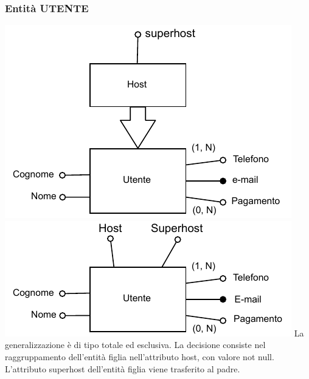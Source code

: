 \subsubsection{Entità UTENTE}
\includegraphics[width=\textwidth]{resources/page11}
\includegraphics[width=\textwidth]{resources/page12}
La generalizzazione è di tipo totale ed esclusiva. La decisione consiste nel raggruppamento dell'entità figlia nell'attributo host, con valore not null. L'attributo superhost dell'entità figlia viene trasferito al padre.

